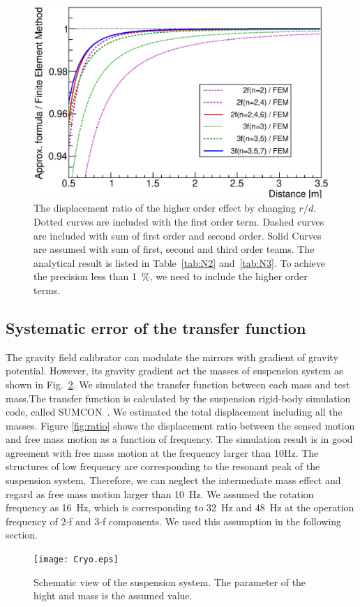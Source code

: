 \documentclass[A4]{spie}  %
\begin{document}
\begin{figure}
\begin{center}
\includegraphics[width=12cm]{dvsx_ratio.eps}
\caption{The displacement ratio of the higher order effect by changing $r/d$. Dotted curves are included with the first order term. Dashed curves are included with sum of first order and second order. Solid Curves are assumed with sum of first, second and third order teams. The analytical result is listed in Table~\ref{tab:N2} and~\ref{tab:N3}. To achieve the precision less than 1~\%, we need to include the higher order terms.}
\label{fig:FEM}
\end{center}
\end{figure}


\subsection{Systematic error of the transfer function}
The gravity field calibrator can modulate the mirrors with gradient of gravity potential. However, its gravity gradient act the masses of suspension system as shown in Fig.~\ref{fig:cryo}. We simulated the transfer function between each mass and test mass.The transfer function is calculated by the suspension rigid-body simulation code, called SUMCON~\cite{SUMCON}. We estimated the total displacement including all the masses. Figure \ref{fig:ratio} shows the displacement ratio between the sensed motion and free mass motion as a function of frequency. The simulation result is in good agreement with free mass motion at the frequency larger than 10Hz. The structures of low frequency are corresponding to the resonant peak of the suspension system. Therefore, we can neglect the intermediate mass effect and regard as free mass motion larger than 10~Hz. We assumed the rotation frequency as 16~Hz, which is corresponding to 32~Hz and 48~Hz at the operation frequency of 2-f and 3-f components.  We used this assumption in the following section.
\begin{figure}
\begin{center}
\texttt{[image: Cryo.eps]}
\caption{Schematic view of the suspension system. The parameter of the hight and mass is the assumed value. }
\label{fig:cryo}
\end{center}
\end{figure}
\end{document}
